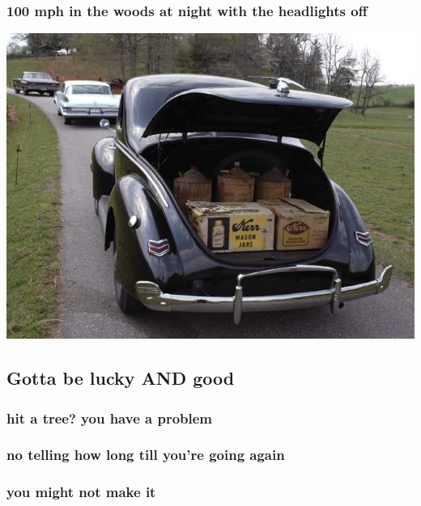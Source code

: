 \documentclass[10pt,oneside,x11names]{article}
\begin{document}
\subsubsection{100 mph in the woods at night with the headlights off}
\label{sec:org72c08bd}
\begin{center}
\includegraphics[width=.9\linewidth]{./6a00d8341bfe8453ef0134802e46f2970c-800wi.hooch.jpg}
\end{center}
\subsection{Gotta be lucky AND good}
\label{sec:org38fab8d}
\subsubsection{hit a tree? you have a problem}
\label{sec:orgcce4ad6}
\subsubsection{no telling how long till you're going again}
\label{sec:org863556b}
\subsubsection{you might not make it}
\label{sec:org0be90b7}
\end{document}
